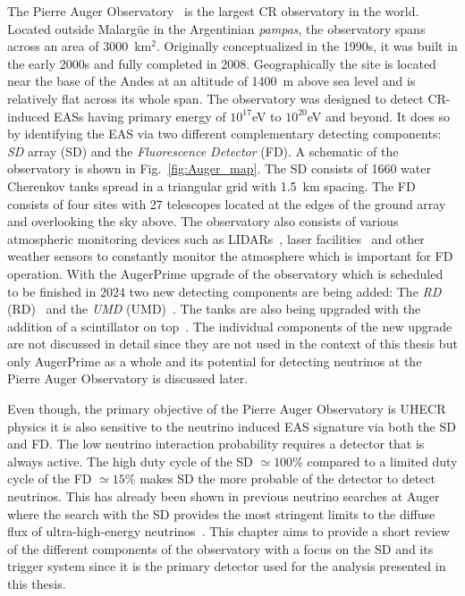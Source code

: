 The Pierre Auger Observatory~\cite{Auger:2015} is the largest CR observatory in the world. Located outside Malargüe in the Argentinian \textit{pampas}, the observatory spans across an area of 3000 km$^2$. Originally conceptualized in the 1990s, it was built in the early 2000s and fully completed in 2008. Geographically the site is located near the base of the Andes at an altitude of 1400 m above sea level and is relatively flat across its whole span. The observatory was designed to detect CR-induced EASs having primary energy of $10^{17}$eV to $10^{20}$eV and beyond. It does so by identifying the EAS via two different complementary detecting components: \textit{\acrlong{SD}} array (\acrshort{SD}) and the \textit{Fluorescence Detector} (\acrshort*{FD}). A schematic of the observatory is shown in Fig.~\ref{fig:Auger_map}. The SD consists of 1660 water Cherenkov tanks spread in a triangular grid with 1.5 km spacing. The FD consists of four sites with 27 telescopes located at the edges of the ground array and overlooking the sky above. The observatory also consists of various atmospheric monitoring devices such as LIDARs~\cite{BENZVI2007171}, laser facilities~\cite{article_clf,Lawrence_Wiencke_2009} and other weather sensors to constantly monitor the atmosphere which is important for FD operation. With the AugerPrime upgrade of the observatory which is scheduled to be finished in 2024 two new detecting components are being added: The \textit{\acrlong{RD}} (\acrshort{RD})~\cite{Horandel:2023XL} and the \textit{\acrlong{UMD}} (\acrshort{UMD})~\cite{AbdulHalim:2023ZF}. The tanks are also being upgraded with the addition of a scintillator on top~\cite{Cataldi:2021uwd}. The individual components of the new upgrade are not discussed in detail since they are not used in the context of this thesis but only AugerPrime as a whole and its potential for detecting neutrinos at the Pierre Auger Observatory is discussed later.

Even though, the primary objective of the Pierre Auger Observatory is UHECR physics it is also sensitive to the neutrino induced EAS signature via both the SD and FD. The low neutrino interaction probability requires a detector that is always active. The high duty cycle of the SD $\simeq 100$\% compared to a limited duty cycle of the FD $\simeq 15$\% makes SD the more probable of the detector to detect neutrinos. This has already been shown in previous neutrino searches at Auger where the search with the SD provides the most stringent limits to the diffuse flux of ultra-high-energy neutrinos~\cite{Aab_2019_diffuse}. This chapter aims to provide a short review of the different components of the observatory with a focus on the SD and its trigger system since it is the primary detector used for the analysis presented in this thesis. 

